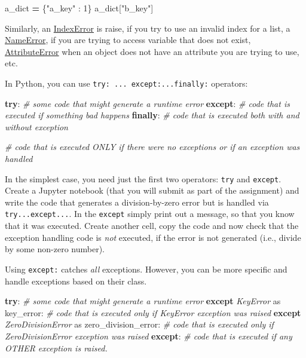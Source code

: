 \documentclass[
]{book}
\newenvironment{Shaded}{\begin{snugshade}}{\end{snugshade}}
\newcommand{\CommentTok}[1]{\textcolor[rgb]{0.56,0.35,0.01}{\textit{#1}}}
\newcommand{\ControlFlowTok}[1]{\textcolor[rgb]{0.13,0.29,0.53}{\textbf{#1}}}
\newcommand{\DecValTok}[1]{\textcolor[rgb]{0.00,0.00,0.81}{#1}}
\newcommand{\ImportTok}[1]{#1}
\newcommand{\NormalTok}[1]{#1}
\newcommand{\OperatorTok}[1]{\textcolor[rgb]{0.81,0.36,0.00}{\textbf{#1}}}
\newcommand{\PreprocessorTok}[1]{\textcolor[rgb]{0.56,0.35,0.01}{\textit{#1}}}
\newcommand{\StringTok}[1]{\textcolor[rgb]{0.31,0.60,0.02}{#1}}
\begin{document}
\begin{Shaded}
\begin{Highlighting}[]
\NormalTok{a\_dict }\OperatorTok{=}\NormalTok{ \{}\StringTok{"a\_key"}\NormalTok{ : }\DecValTok{1}\NormalTok{\}}
\NormalTok{a\_dict[}\StringTok{"b\_key"}\NormalTok{]}
\end{Highlighting}
\end{Shaded}

Similarly, an \href{https://docs.python.org/3/library/exceptions.html\#IndexError}{IndexError} is raise, if you try to use an invalid index for a list, a \href{https://docs.python.org/3/library/exceptions.html\#NameError}{NameError}, if you are trying to access variable that does not exist, \href{https://docs.python.org/3/library/exceptions.html\#AttributeError}{AttributeError} when an object does not have an attribute you are trying to use, etc.

In Python, you can use \texttt{try:\ ...\ except:...finally:} operators:

\begin{Shaded}
\begin{Highlighting}[]
\ControlFlowTok{try}\NormalTok{:}
    \CommentTok{\# some code that might generate a runtime error}
\ControlFlowTok{except}\NormalTok{:  }
    \CommentTok{\# code that is executed if something bad happens}
\ControlFlowTok{finally}\NormalTok{:}
    \CommentTok{\# code that is executed both with and without exception}
    
\CommentTok{\# code that is executed ONLY if there were no exceptions or if an exception was handled}
\end{Highlighting}
\end{Shaded}

In the simplest case, you need just the first two operators: \texttt{try} and \texttt{except}. Create a Jupyter notebook (that you will submit as part of the assignment) and write the code that generates a division-by-zero error but is handled via \texttt{try...except...}. In the \texttt{except} simply print out a message, so that you know that it was executed. Create another cell, copy the code and now check that the exception handling code is \emph{not} executed, if the error is not generated (i.e., divide by some non-zero number).

Using \texttt{except:} catches \emph{all} exceptions. However, you can be more specific and handle exceptions based on their class.

\begin{Shaded}
\begin{Highlighting}[]
\ControlFlowTok{try}\NormalTok{:}
    \CommentTok{\# some code that might generate a runtime error}
\ControlFlowTok{except} \PreprocessorTok{KeyError} \ImportTok{as}\NormalTok{ key\_error:  }
    \CommentTok{\# code that is executed only if KeyError exception was raised}
\ControlFlowTok{except} \PreprocessorTok{ZeroDivisionError} \ImportTok{as}\NormalTok{ zero\_division\_error:  }
    \CommentTok{\# code that is executed only if ZeroDivisionError exception was raised}
\ControlFlowTok{except}\NormalTok{:}
    \CommentTok{\# code that is executed if any OTHER exception is raised.}
\end{Highlighting}
\end{Shaded}
\end{document}
